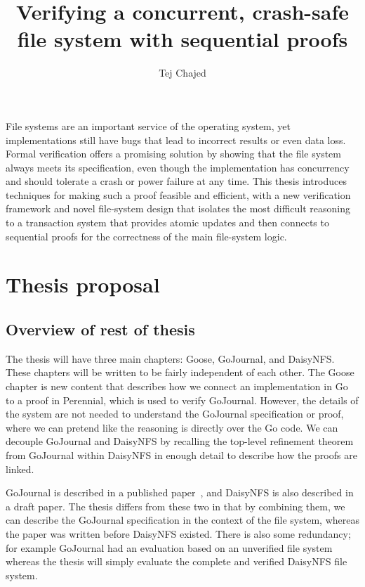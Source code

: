\documentclass[fontsize=12pt,paper=letter,cleardoublepage=plain,twoside=false]{scrbook}
\title{Verifying a concurrent, crash-safe file system with sequential proofs}
\author{Tej Chajed}
\begin{document}
\mainmatter

File systems are an important service of the operating system, yet
implementations still have bugs that lead to incorrect results or even data loss. Formal
verification offers a promising solution by showing that the file system always
meets its specification, even though the implementation has concurrency and
should tolerate a crash or power failure at any time. This thesis introduces
techniques for making such a proof feasible and efficient, with a new
verification framework and novel file-system design that isolates the most
difficult reasoning to a transaction system that provides atomic updates and
then connects to sequential proofs for the correctness of the main file-system
logic.

%


\chapter{Thesis proposal}


\section{Overview of rest of thesis}
The thesis will have three main chapters: Goose, GoJournal, and DaisyNFS.\@
These chapters will be written to be fairly independent of each other. The Goose
chapter is new content that describes how we connect an implementation in Go to
a proof in Perennial, which is used to verify GoJournal. However, the details of
the system are not needed to understand the GoJournal specification or proof,
where we can pretend like the reasoning is directly over the Go code. We can
decouple GoJournal and DaisyNFS by recalling the top-level refinement theorem
from GoJournal within DaisyNFS in enough detail to describe how the proofs are
linked.

GoJournal is described in a published paper~\cite{chajed:gojournal}, and
DaisyNFS is also described in a draft paper. The thesis differs from these two
in that by combining them, we can describe the GoJournal specification in the
context of the file system, whereas the paper was written before DaisyNFS
existed. There is also some redundancy; for example GoJournal had an evaluation
based on an unverified file system whereas the thesis will simply evaluate the
complete and verified DaisyNFS file system.
\end{document}
